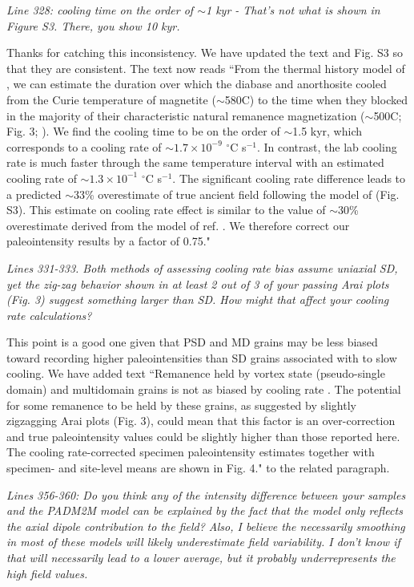 \documentclass[11pt, letterpaper]{article}
\begin{document}
\begin{flushleft}
\textit{Line 328: cooling time on the order of $\sim$1 kyr - That's not what is shown in Figure S3. There, you show 10 kyr.}

Thanks for catching this inconsistency. We have updated the text and Fig. S3 so that they are consistent. The text now reads ``From the thermal history model of \cite{Zhang2021b}, we can estimate the duration over which the diabase and anorthosite cooled from the Curie temperature of magnetite ($\sim$580\textdegree C) to the time when they blocked in the majority of their characteristic natural remanence magnetization ($\sim$500\textdegree  C; Fig. 3; \citealp{Zhang2021b}). We find the cooling time to be on the order of $\sim$1.5 kyr, which corresponds to a cooling rate of $\sim1.7\times10^{-9}$ $^\circ$C s$^{-1}$. In contrast, the lab cooling rate is much faster through the same temperature interval with an estimated cooling rate of $\sim1.3\times10^{-1}$ $^\circ$C s$^{-1}$. The significant cooling rate difference leads to a predicted $\sim$33\% overestimate of true ancient field following the model of \citealp{Halgedahl1980a} (Fig. S3). This estimate on cooling rate effect is similar to the value of $\sim$30\% overestimate derived from the model of ref. \citealp{Nagy2021a}. We therefore correct our paleointensity results by a factor of 0.75."

\textit{Lines 331-333. Both methods of assessing cooling rate bias assume uniaxial SD, yet the zig-zag behavior shown in at least 2 out of 3 of your passing Arai plots (Fig. 3) suggest something larger than SD. How might that affect your cooling rate calculations?}

This point is a good one given that PSD and MD grains may be less biased toward recording higher paleointensities than SD grains associated with to slow cooling. We have added text ``Remanence held by vortex state (pseudo-single domain) and multidomain grains is not as biased by cooling rate \citep{Biggin2013a}. The potential for some remanence to be held by these grains, as suggested by slightly zigzagging Arai plots (Fig. 3), could mean that this factor is an over-correction and true paleointensity values could be slightly higher than those reported here. The cooling rate-corrected specimen paleointensity estimates together with specimen- and site-level means are shown in Fig. 4." to the related paragraph. 

\textit{Lines 356-360: Do you think any of the intensity difference between your samples and the PADM2M model can be explained by the fact that the model only reflects the axial dipole contribution to the field? Also, I believe the necessarily smoothing in most of these models will likely underestimate field variability. I don't know if that will necessarily lead to a lower average, but it probably underrepresents the high field values.}


\end{flushleft}
\end{document}
